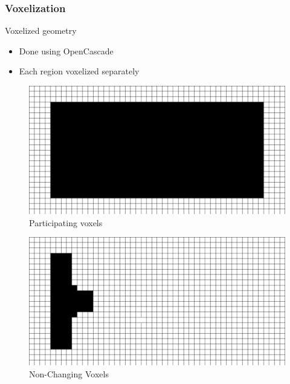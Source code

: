 \subsubsection{Voxelization}
\begin{frame}{Voxelized geometry}
\begin{itemize}
\item Done using OpenCascade  
\item Each region voxelized separately 
\end{itemize}
\vspace{0.4cm}
\begin{minipage}{0.49\textwidth}
\begin{figure}
\includegraphics[width=.8\textwidth]{Pictures/Voxels/Active.pdf}
\caption{Participating voxels}
\end{figure}
\vspace{-0.6cm}
 \begin{figure}
\includegraphics[width=.8\textwidth]{Pictures/Voxels/NonChanging.pdf}
\caption{Non-Changing Voxels}
\end{figure}
\end{minipage}

\end{frame}
